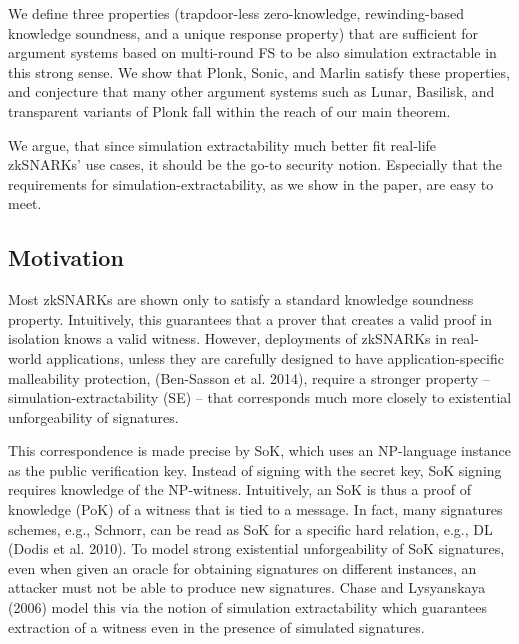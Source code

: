 \documentclass[11pt]{llncs}
\begin{document}
We define three properties (trapdoor-less zero-knowledge, rewinding-based knowledge soundness, and a unique response property) that are sufficient for argument systems based on multi-round FS to be also simulation extractable in this strong sense. We show that Plonk, Sonic, and Marlin satisfy these properties, and conjecture that many other argument systems such as Lunar, Basilisk, and transparent variants of Plonk fall within the reach of our main theorem.

We argue, that since simulation extractability much better fit real-life zkSNARKs' use cases, it should be the go-to security notion. Especially that the requirements for simulation-extractability, as we show in the paper, are easy to meet. 

\subsection{Motivation}
Most zkSNARKs are shown only to satisfy a standard knowledge soundness property.
Intuitively, this guarantees that a prover that creates a valid proof
in isolation knows a valid witness. However, deployments of zkSNARKs in
real-world applications, unless they are carefully designed to have
application-specific malleability protection, (Ben-Sasson et al. 2014),
require a stronger property -- simulation-extractability (SE) -- that
corresponds much more closely to existential unforgeability of signatures.

This correspondence is made precise by SoK, which uses an NP-language instance
as the public verification key. Instead of signing with the secret key, SoK
signing requires knowledge of the NP-witness. Intuitively, an SoK is thus a
proof of knowledge (PoK) of a witness that is tied to a message. In fact, many
signatures schemes, e.g., Schnorr, can be read as SoK for a specific hard
relation, e.g., DL (Dodis et al. 2010). To model strong existential unforgeability
of SoK signatures, even when given an oracle for obtaining signatures on
different instances, an attacker must not be able to produce new signatures.
Chase and Lysyanskaya (2006) model this via the notion of simulation
extractability which guarantees extraction of a witness even in the presence of
simulated signatures.
\end{document}
